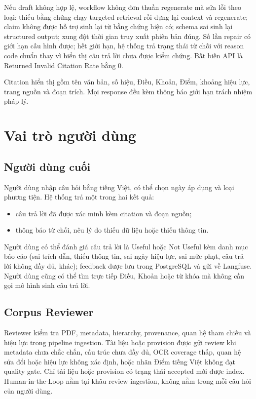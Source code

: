 \documentclass[12pt,a4paper]{article}
\begin{document}
Nếu draft không hợp lệ, workflow không đơn thuần regenerate mà sửa lỗi theo loại: thiếu bằng chứng chạy targeted retrieval rồi dựng lại context và regenerate; claim không được hỗ trợ sinh lại từ bằng chứng hiện có; schema sai sinh lại structured output; xung đột thời gian truy xuất phiên bản đúng. Số lần repair có giới hạn cấu hình được; hết giới hạn, hệ thống trả trạng thái từ chối với reason code chuẩn thay vì hiển thị câu trả lời chưa được kiểm chứng. Bất biến API là Returned Invalid Citation Rate bằng 0.

Citation hiển thị gồm tên văn bản, số hiệu, Điều, Khoản, Điểm, khoảng hiệu lực, trang nguồn và đoạn trích. Mọi response đều kèm thông báo giới hạn trách nhiệm pháp lý.

\section{Vai trò người dùng}

\subsection{Người dùng cuối}

Người dùng nhập câu hỏi bằng tiếng Việt, có thể chọn ngày áp dụng và loại phương tiện. Hệ thống trả một trong hai kết quả:

\begin{itemize}
  \item câu trả lời đã được xác minh kèm citation và đoạn nguồn;
  \item thông báo từ chối, nêu lý do thiếu dữ liệu hoặc thiếu thông tin.
\end{itemize}

Người dùng có thể đánh giá câu trả lời là Useful hoặc Not Useful kèm danh mục báo cáo (sai trích dẫn, thiếu thông tin, sai ngày hiệu lực, sai mức phạt, câu trả lời không đầy đủ, khác); feedback được lưu trong PostgreSQL và gửi về Langfuse. Người dùng cũng có thể tìm trực tiếp Điều, Khoản hoặc từ khóa mà không cần gọi mô hình sinh câu trả lời.

\subsection{Corpus Reviewer}

Reviewer kiểm tra PDF, metadata, hierarchy, provenance, quan hệ tham chiếu và hiệu lực trong pipeline ingestion. Tài liệu hoặc provision được gửi review khi metadata chưa chắc chắn, cấu trúc chưa đầy đủ, OCR coverage thấp, quan hệ sửa đổi hoặc hiệu lực không xác định, hoặc nhãn Điểm tiếng Việt không đạt quality gate. Chỉ tài liệu hoặc provision có trạng thái accepted mới được index. Human-in-the-Loop nằm tại khâu review ingestion, không nằm trong mỗi câu hỏi của người dùng.
\end{document}
